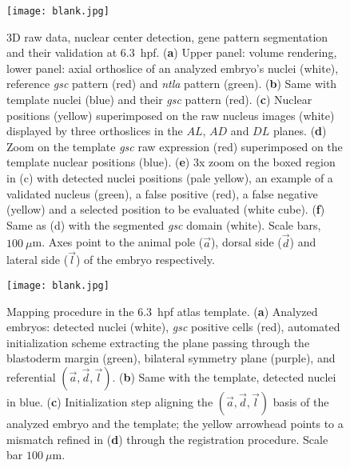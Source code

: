 \begin{figure*}[h!]

    \centering

    \texttt{[image: blank.jpg]} %

    \caption{3D raw data, nuclear center detection, gene pattern segmentation and their validation at 6.3~hpf. (\textbf{a}) Upper panel: volume rendering, lower panel: axial orthoslice of an analyzed embryo's nuclei (white), reference \emph{gsc} pattern (red) and \emph{ntla} pattern (green). (\textbf{b}) Same with template nuclei (blue) and their \emph{gsc} pattern (red). (\textbf{c}) Nuclear positions (yellow) superimposed on the raw nucleus images (white) displayed by three orthoslices in the $AL$, $AD$ and $DL$ planes. (\textbf{d}) Zoom on the template \emph{gsc} raw expression (red) superimposed on the template nuclear positions (blue). (\textbf{e}) 3x zoom on the boxed region in (c) with detected nuclei positions (pale yellow), an example of a validated nucleus (green), a false positive (red), a false negative (yellow) and a selected position to be evaluated (white cube). (\textbf{f}) Same as (d) with the segmented \emph{gsc} domain (white). Scale bars, $100~\mu$m. Axes point to the animal pole ($\vec{a}$), dorsal side ($\vec{d}$) and lateral side ($\vec{l}$) of the embryo respectively.}

    \label{fig:rawData}

\end{figure*}






\begin{figure}[h!]

    \centering

    \texttt{[image: blank.jpg]} %

    \caption{Mapping procedure in the 6.3~hpf atlas template. (\textbf{a}) Analyzed embryos: detected nuclei (white), \emph{gsc} positive cells (red), automated initialization scheme extracting the plane passing through the blastoderm margin (green), bilateral symmetry plane (purple), and referential $(\vec{a},\vec{d},\vec{l})$. (\textbf{b}) Same with the template, detected nuclei in blue. (\textbf{c}) Initialization step aligning the $(\vec{a},\vec{d},\vec{l})$ basis of the analyzed embryo and the template; the yellow arrowhead points to a mismatch refined in (\textbf{d}) through the registration procedure. Scale bar $100~\mu$m.}

    \label{fig:referentialAxis}

\end{figure}

